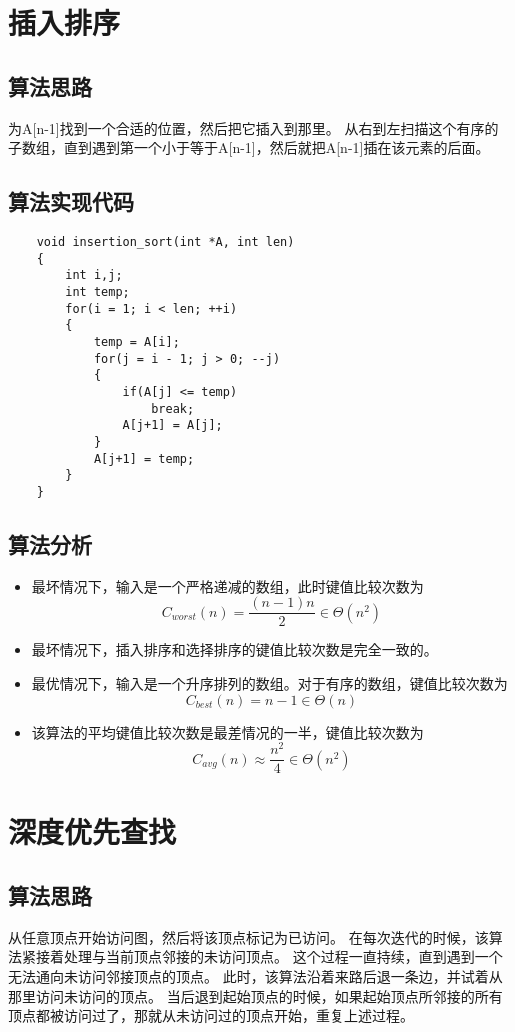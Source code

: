 \documentclass[a4paper,left=2.5cm,right=2.5cm,11pt]{article}
\begin{document}
\tableofcontents

\clearpage

\section{插入排序}
\subsection{算法思路}
	为A[n-1]找到一个合适的位置，然后把它插入到那里。
	从右到左扫描这个有序的子数组，直到遇到第一个小于等于A[n-1]，然后就把A[n-1]插在该元素的后面。
\subsection{算法实现代码}
	\begin{lstlisting}
	void insertion_sort(int *A, int len)
	{
		int i,j;
		int temp;
		for(i = 1; i < len; ++i)
		{
			temp = A[i];
			for(j = i - 1; j > 0; --j)
			{
				if(A[j] <= temp)
					break;
				A[j+1] = A[j];
			}
			A[j+1] = temp;
		}
	}
	\end{lstlisting}
\subsection{算法分析}
	\begin{itemize}
		\item 最坏情况下，输入是一个严格递减的数组，此时键值比较次数为
		\begin{equation}
			C_{worst}(n) = \frac{(n-1)n}{2} \in \Theta(n^2)
		\end{equation}
		\item 最坏情况下，插入排序和选择排序的键值比较次数是完全一致的。
		\item 最优情况下，输入是一个升序排列的数组。对于有序的数组，键值比较次数为
		\begin{equation}
			C_{best}(n) = n-1 \in \Theta(n)
		\end{equation}
		\item 该算法的平均键值比较次数是最差情况的一半，键值比较次数为
		\begin{equation}
			C_{avg}(n) \approx \frac{n^2}{4} \in \Theta(n^2)
		\end{equation}
	\end{itemize}

\section{深度优先查找}
\subsection{算法思路}
	从任意顶点开始访问图，然后将该顶点标记为已访问。
	在每次迭代的时候，该算法紧接着处理与当前顶点邻接的未访问顶点。
	这个过程一直持续，直到遇到一个无法通向未访问邻接顶点的顶点。
	此时，该算法沿着来路后退一条边，并试着从那里访问未访问的顶点。
	当后退到起始顶点的时候，如果起始顶点所邻接的所有顶点都被访问过了，那就从未访问过的顶点开始，重复上述过程。
\end{document}
